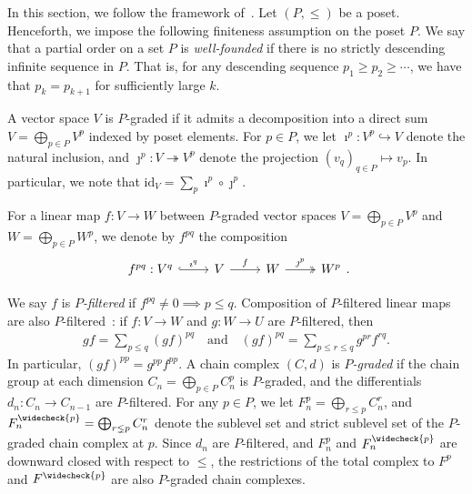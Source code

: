 \documentclass[11pt, table, nothms]{amsart}
\theoremstyle{definition}
\newcommand{\C}{C}
\newcommand{\id}{\mathrm{id}}
\newcommand{\vp}{\widecheck{p}}
\begin{document}
{In this section, we follow the framework of~\cite{Robbin1992LyapunovFunctor,harker2021, Mrozek2025ConnectionDynamics}. Let $(P, \leq)$ be a poset. 
Henceforth, we impose the following finiteness assumption on the poset $P$.
We say that a partial order on a set $P$ is \emph{well-founded} if there is no strictly descending infinite sequence in $P$. 
That is, for any descending sequence $p_1 \geq p_2 \geq \cdots $, we have that $p_k = p_{k+1}$ for sufficiently large $k$. 

A vector space $V$ is $P$-graded if it admits a decomposition into a direct sum $V  = \bigoplus_{p \in P} V^p$ indexed by poset elements. 
For $p \in P$, we let $\imath^p: V^p \hookrightarrow V$ denote the natural inclusion, and $\jmath^p: V \twoheadrightarrow V^p$ denote the projection $(v_q)_{q \in P} \mapsto v_p$. 
In particular, we note that $\id_V = \sum_p \imath^p \circ \jmath^p$. 

For a linear map $f: V \to W$ between $P$-graded vector spaces $V = \bigoplus_{p \in P} V^p$ and $W = \bigoplus_{p \in P} W^p$, we denote by $f^{pq}$ the composition
\begin{equation*}
    \begin{tikzcd}
f^{pq}: V^q \ar[r, "\imath^q", hookrightarrow] &
V \ar[r, "f"] &
W \ar[r, "\jmath^p", twoheadrightarrow] &
W^p
\end{tikzcd}.
\end{equation*}
\begin{sloppypar}
We say $f$ is \emph{$P$-filtered} if $f^{pq} \neq 0 \implies p \leq q$. Composition of $P$-filtered linear maps are also $P$-filtered~\cite[Prop~ 4.3]{harker2021}: if $f: V \to W$ and $g: W \to U$ are $P$-filtered, then 
\begin{align} \label{eq:graded_compose}
    gf  = \sum_{p \leq  q}(gf)^{pq} \quad \text{and} \quad  (gf)^{pq}  = \sum_{p \leq r \leq q}g^{pr} f^{rq}.
\end{align} 
In particular, $(gf)^{pp}  = g^{pp} f^{pp}$. 
A chain complex $(C,d)$ is \emph{$P$-graded} if the chain group at each dimension $C_n = \bigoplus_{p \in P} \C^p_n$ is $P$-graded, and the differentials $d_n: C_{n} \to C_{n-1}$ are $P$-filtered. For any $p \in P$, we let $F^p_n = \bigoplus_{r \leq p} \C^{r}_n$, and $F^{\vp}_n = \bigoplus_{r \lneq p} \C^{r}_n$ denote the sublevel set and strict sublevel set of the $P$-graded chain complex at $p$. Since $d_n$ are $P$-filtered, and $F^p_n$ and $F^{\vp}_n$ are downward closed with respect to $\leq$, the restrictions of the total complex to $F^p$ and $F^{\vp}$ are also $P$-graded chain complexes. 
\end{sloppypar}

}
\end{document}
